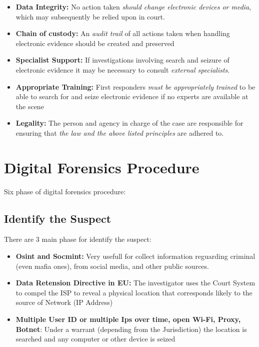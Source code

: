 \begin{itemize}
  \item \textbf{Data Integrity:} No action taken \textit{should change electronic devices or media},
    which may subsequently be relied upon in court.
  \item \textbf{Chain of custody:} An \textit{audit trail} of all actions taken when handling electronic
    evidence should be created and preserved
  \item \textbf{Specialist Support:} If investigations involving search and seizure of electronic
    evidence it may be necessary to consult \textit{external specialists}.
  \item \textbf{Appropriate Training:} First responders \textit{must be appropriately trained} to be able
    to search for and seize electronic evidence if no experts are available at the scene
  \item \textbf{Legality:} The person and agency in charge of the case are responsible
    for ensuring that \textit{the law and the above listed principles} are adhered to.
\end{itemize}

\section{Digital Forensics Procedure}
Six phase of digital forensics procedure:

\subsection{Identify the Suspect}
There are 3 main phase for identify the suspect:

\begin{itemize}
  \item \textbf{Osint and Socmint:} Very usefull for collect information reguarding criminal
    (even mafia ones), from social media, and other public sources.
  \item \textbf{Data Retension Directive in EU:} The investigator uses the Court
    System to compel the ISP to reveal a physical location that
    corresponds likely to the source of Network (IP Address)
  \item \textbf{Multiple User ID or multiple
    Ips over time,  open Wi-Fi, Proxy, Botnet}: Under a warrant (depending from the Jurisdiction)
    the location is searched and any computer or other device is seized
\end{itemize}

